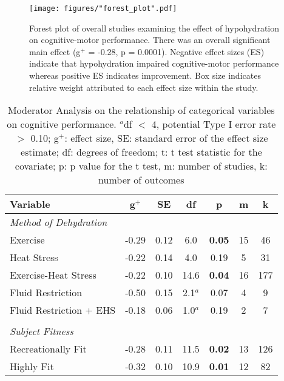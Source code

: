 \begin{figure}
	\centering
	\texttt{[image: figures/"forest\_plot".pdf]}
	\caption{Forest plot of overall studies examining the effect of hypohydration on cognitive-motor performance. There was an overall significant main effect (g${^+}$ = -0.28, p = 0.0001). Negative effect sizes (ES) indicate that hypohydration impaired cognitive-motor performance whereas positive ES indicates improvement. Box size indicates relative weight attributed to each effect size within the study.}
	\label{fig:forest_plot}
\end{figure}

\begin{table}
	\caption{Moderator Analysis on the relationship of categorical variables on cognitive performance. ${^a}$df ${<}$ 4, potential Type I error rate ${>}$ 0.10; g${^+}$: effect size, SE: standard error of the effect size estimate; df: degrees of freedom; t: t test statistic for the covariate; p: p value for the t test, m: number of studies, k: number of outcomes}
	\centering
	
	\begin{tabular}{lcccccc} 
		\hline
		\textbf{Variable} & \textbf{g${^+}$} & \textbf{SE} & \textbf{df} & \textbf{p} & \textbf{m} & 
		\textbf{k} \\
		\hline
		\textit{Method of Dehydration} &&&&&& \\
		Exercise & -0.29 & 0.12 & 6.0 & \textbf{0.05} & 15 & 46 \\
		Heat Stress & -0.22 & 0.14 & 4.0 & 0.19 & 5 & 31 \\
		Exercise-Heat Stress & -0.22 & 0.10 & 14.6 & \textbf{0.04} & 16 & 177 \\
		Fluid Restriction & -0.50 & 0.15 & 2.1${^a}$ & 0.07 & 4 & 9 \\
		Fluid Restriction + EHS	& -0.18 & 0.06 & 1.0${^a}$ & 0.19 & 2 & 7 \\
		&&&&&& \\
		\textit{Subject Fitness} &&&&&& \\
		Recreationally Fit & -0.28 & 0.11 & 11.5 & \textbf{0.02} & 13 & 126 \\
		Highly Fit &  -0.32 & 0.10 & 10.9 & \textbf{0.01} & 12 & 82 \\ 
		\hline	    
	\end{tabular}
	\label{tbl:moderators}
\end{table}

